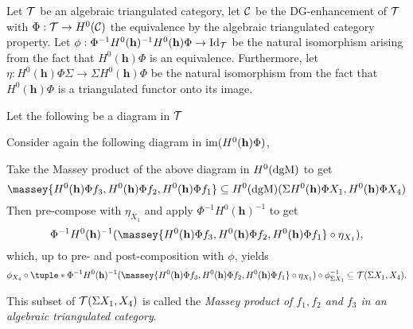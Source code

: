 \begin{definition}
    \label{def:massey_product_alg_tri_cat}
    Let \( {\mathcal{T}} \) be an algebraic triangulated category, let \( {\mathcal{C}} \) be the DG-enhancement of \( {\mathcal{T}} \) with \( \Phi: {\mathcal{T}} \to H^0({\mathcal{C}}) \) the equivalence by the algebraic triangulated category property. Let \( \phi: \Phi^{-1} H^0(\mathbf{h})^{-1} H^0(\mathbf{h}) \Phi \to \operatorname{Id}_{{\mathcal{T}}} \) be the natural isomorphism arising from the fact that \( H^0(\mathbf{h}) \Phi \) is an equivalence. Furthermore, let \( \eta: H^0(\mathbf{h}) \Phi \Sigma \to \Sigma H^0(\mathbf{h}) \Phi \) be the natural isomorphism from the fact that \( H^0(\mathbf{h}) \Phi \) is a triangulated functor onto its image.
    
    Let the following be a diagram in \( {\mathcal{T}} \)
    \begin{center}
    \end{center}
    Consider again the following diagram in \( \operatorname{im}(H^0(\mathbf{h}) \Phi) \),
    \begin{center}
    \end{center}
    Take the Massey product of the above diagram in \( H^0(\operatorname{dgM}) \) to get
    \[
        \massey{H^0(\mathbf{h}) \Phi f_3, H^0(\mathbf{h}) \Phi f_2, H^0(\mathbf{h}) \Phi f_1} \subseteq H^0(\dgM)(\Sigma H^0(\mathbf{h}) \Phi X_1, H^0(\mathbf{h}) \Phi X_4)
    \]
    Then pre-compose with \( \eta_{X_1} \) and apply \( \Phi^{-1} H^0(\mathbf{h})^{-1} \) to get
    \[
        \Phi^{-1} H^0(\mathbf{h})^{-1} (\massey{H^0(\mathbf{h}) \Phi f_3, H^0(\mathbf{h}) \Phi f_2, H^0(\mathbf{h}) \Phi f_1} \circ \eta_{X_1}),
    \]
    which, up to pre- and post-composition with \( \phi \), yields
    \[
        \phi_{X_4} \circ \tuple*{\Phi^{-1} H^0(\mathbf{h})^{-1} (\massey{H^0(\mathbf{h}) \Phi f_3, H^0(\mathbf{h}) \Phi f_2, H^0(\mathbf{h}) \Phi f_1} \circ \eta_{X_1})} \circ \phi^{-1}_{\Sigma X_1} \subseteq \Tc(\Sigma X_1, X_4).
    \]

    This subset of \( {\mathcal{T}}(\Sigma X_1, X_4) \) is called the \emph{Massey product of \( f_1, f_2 \) and \( f_3 \) in an algebraic triangulated category}.
\end{definition}


